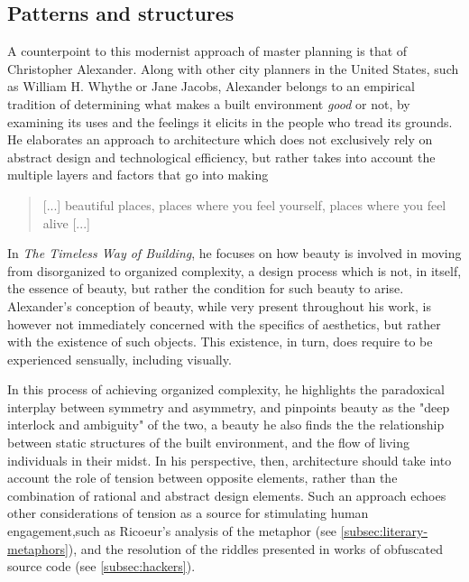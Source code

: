 \subsection{Patterns and structures}
\label{subsec:patterns-structures}

A counterpoint to this modernist approach of master planning is that of Christopher Alexander. Along with other city planners in the United States, such as William H. Whythe or Jane Jacobs, Alexander belongs to an empirical tradition of determining what makes a built environment \emph{good} or not, by examining its uses and the feelings it elicits in the people who tread its grounds. He elaborates an approach to architecture which does not exclusively rely on abstract design and technological efficiency, but rather takes into account the multiple layers and factors that go into making

\begin{quote}
    [...] beautiful places, places where you feel yourself, places where you feel alive \citep{alexander_timeless_1979} [...]
\end{quote}

In \emph{The Timeless Way of Building}, he focuses on how beauty is involved in moving from disorganized to organized complexity, a design process which is not, in itself, the essence of beauty, but rather the condition for such beauty to arise. Alexander's conception of beauty, while very present throughout his work, is however not immediately concerned with the specifics of aesthetics, but rather with the existence of such objects. This existence, in turn, does require to be experienced sensually, including visually.

In this process of achieving organized complexity, he highlights the paradoxical interplay between symmetry and asymmetry, and pinpoints beauty as the "deep interlock and ambiguity" of the two, a beauty he also finds the the relationship between static structures of the built environment, and the flow of living individuals in their midst. In his perspective, then, architecture should take into account the role of tension between opposite elements, rather than the combination of rational and abstract design elements. Such an approach echoes other considerations of tension as a source for stimulating human engagement,such as Ricoeur's analysis of the metaphor (see \ref{subsec:literary-metaphors}), and the resolution of the riddles presented in works of obfuscated source code (see \ref{subsec:hackers}).


